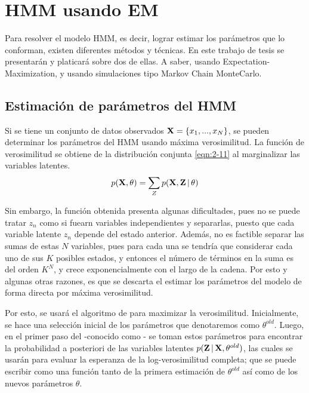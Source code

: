 
\chapter{HMM usando EM} \label{ch:chap3}

Para resolver el modelo HMM, es decir, lograr estimar los parámetros que lo conforman, existen diferentes métodos y técnicas. En este trabajo de tesis se presentarán y platicará sobre dos de ellas. A saber, usando Expectation-Maximization, y usando simulaciones tipo Markov Chain MonteCarlo.

\section{Estimación de parámetros del HMM}

Si se tiene un conjunto de datos observados $\textbf{X} = \lbrace x_1, ..., x_N \rbrace$, se pueden determinar los parámetros del HMM usando máxima verosimilitud. La función de verosimilitud se obtiene de la distribución conjunta \eqref{eqn:2-11} al marginalizar las variables latentes.
\begin{equation}
  p(\textbf{X}, \theta) = \sum_Z p(\textbf{X}, \textbf{Z} \,|\, \theta)
\label{eqn:3-1}
\end{equation}

Sin embargo, la función obtenida presenta algunas dificultades, pues no se puede tratar $z_n$ como si fuearn variables independientes y separarlas, puesto que cada variable latente $z_n$ depende del estado anterior. Además, no es factible separar las sumas de estas $N$ variables, pues para cada una se tendría que considerar cada uno de sus $K$ posibles estados, y entonces el número de términos en la suma es del orden $K^N$, y crece exponencialmente con el largo de la cadena. Por esto y algunas otras razones, es que se descarta el estimar los parámetros del modelo de forma directa por máxima verosimilitud.

Por esto, se usará el algoritmo de \aem para maximizar la verosimilitud. Inicialmente, se hace una selección inicial de los parámetros que denotaremos como $\theta^{old}$. Luego, en el primer paso del \aem -conocido como \estep- se toman estos parámetros para encontrar la probabilidad a posteriori de las variables latentes $p(\textbf{Z} \,|\, \textbf{X}, \theta^{old})$, las cuales se usarán para evaluar la esperanza de la log-verosimilitud completa; que se puede escribir como una función tanto de la primera estimación de $\theta^{old}$ así como de los nuevos parámetros $\theta$.

